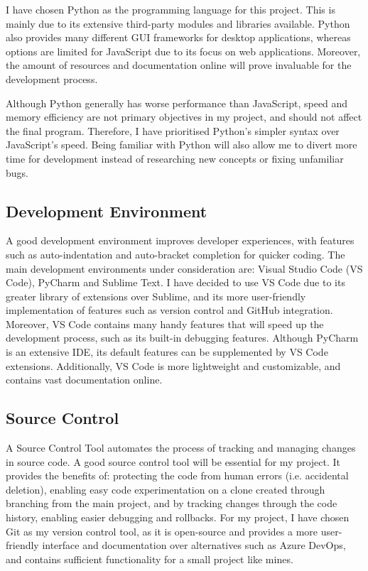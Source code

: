 \documentclass[../main/main.tex]{subfiles}
\begin{document}
I have chosen Python as the programming language for this project. This is mainly due to its extensive third-party modules and libraries available. Python also provides many different GUI frameworks for desktop applications, whereas options are limited for JavaScript due to its focus on web applications. Moreover, the amount of resources and documentation online will prove invaluable for the development process.

Although Python generally has worse performance than JavaScript, speed and memory efficiency are not primary objectives in my project, and should not affect the final program. Therefore, I have prioritised Python’s simpler syntax over JavaScript’s speed. Being familiar with Python will also allow me to divert more time for development instead of researching new concepts or fixing unfamiliar bugs.

\subsection{Development Environment}
A good development environment improves developer experiences, with features such as auto-indentation and auto-bracket completion for quicker coding. The main development environments under consideration are: Visual Studio Code (VS Code), PyCharm and Sublime Text. I have decided to use VS Code due to its greater library of extensions over Sublime, and its more user-friendly implementation of features such as version control and GitHub integration. Moreover, VS Code contains many handy features that will speed up the development process, such as its built-in debugging features. Although PyCharm is an extensive IDE, its default features can be supplemented by VS Code extensions. Additionally, VS Code is more lightweight and customizable, and contains vast documentation online.

\subsection{Source Control}
A Source Control Tool automates the process of tracking and managing changes in source code. A good source control tool will be essential for my project. It provides the benefits of: protecting the code from human errors (i.e. accidental deletion), enabling easy code experimentation on a clone created through branching from the main project, and by tracking changes through the code history, enabling easier debugging and rollbacks. For my project, I have chosen Git as my version control tool, as it is open-source and provides a more user-friendly interface and documentation over alternatives such as Azure DevOps, and contains sufficient functionality for a small project like mines.
\end{document}
